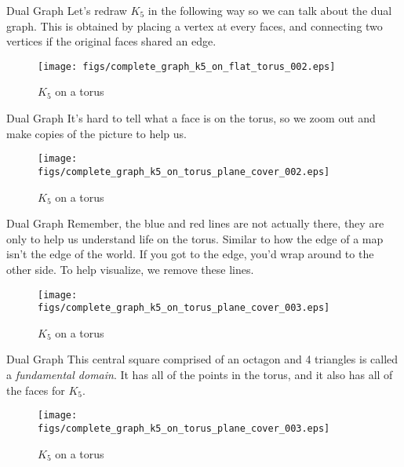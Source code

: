 \documentclass{beamer}
\begin{document}
    \begin{frame}{Dual Graph}
        Let's redraw $K_{5}$ in the following way so we can talk about the
        dual graph. This is obtained by placing a vertex at every faces,
        and connecting two vertices if the original faces shared an edge.
        \begin{figure}
            \centering
            \texttt{[image: figs/complete\_graph\_k5\_on\_flat\_torus\_002.eps]}
            \caption{$K_{5}$ on a torus}
            \label{fig:complete_graph_K5_on_flat_torus2}
        \end{figure}
    \end{frame}
    \begin{frame}{Dual Graph}
        It's hard to tell what a face is on the torus, so we zoom out and make
        copies of the picture to help us.
        \begin{figure}
            \centering
            \texttt{[image: figs/complete\_graph\_k5\_on\_torus\_plane\_cover\_002.eps]}
            \caption{$K_{5}$ on a torus}
            \label{fig:complete_graph_k5_on_torus_plane_cover_002}
        \end{figure}
    \end{frame}
    \begin{frame}{Dual Graph}
        Remember, the blue and red lines are not actually there, they are only to help
        us understand life on the torus. Similar to how the edge of a map isn't the
        edge of the world. If you got to the edge, you'd wrap around to the other side.
        To help visualize, we remove these lines.
        \begin{figure}
            \centering
            \texttt{[image: figs/complete\_graph\_k5\_on\_torus\_plane\_cover\_003.eps]}
            \caption{$K_{5}$ on a torus}
            \label{fig:complete_graph_k5_on_torus_plane_cover_003}
        \end{figure}
    \end{frame}
    \begin{frame}{Dual Graph}
        This central square comprised of an octagon and 4 triangles is called a
        \textit{fundamental domain}. It has all of the points in the torus, and
        it also has all of the faces for $K_{5}$.
        \begin{figure}
            \centering
            \texttt{[image: figs/complete\_graph\_k5\_on\_torus\_plane\_cover\_003.eps]}
            \caption{$K_{5}$ on a torus}
            \label{fig:complete_graph_k5_on_torus_plane_cover_003b}
        \end{figure}
    \end{frame}
\end{document}
